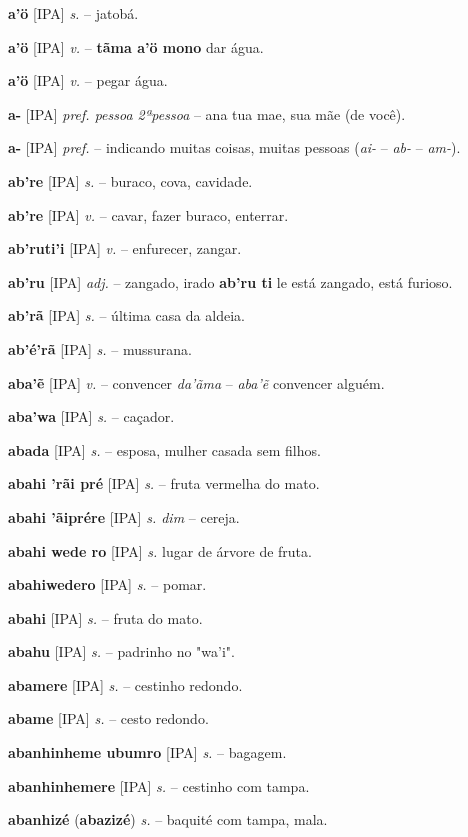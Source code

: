 \textbf{a'ö} [IPA] \textit{s.} -- jatobá.

\textbf{a'ö} [IPA] \textit{v.} -- \textbf{tãma a'ö mono} dar água.

\textbf{a'ö} [IPA] \textit{v.} -- pegar água.

\textbf{a-} [IPA] \textit{pref. pessoa 2ªpessoa} -- ana tua mae, sua mãe (de você).

\textbf{a-} [IPA] \textit{pref.} -- indicando muitas coisas, muitas pessoas (\textit{ai-} -- \textit{ab-} -- \textit{am-}).

\textbf{ab're} [IPA] \textit{s.} -- buraco, cova, cavidade.

\textbf{ab're} [IPA] \textit{v.} -- cavar, fazer buraco, enterrar.

\textbf{ab'ruti'i} [IPA] \textit{v.} -- enfurecer, zangar.

\textbf{ab'ru} [IPA] \textit{adj.} -- zangado, irado \textbf{ab'ru ti} le está zangado, está furioso.

\textbf{ab'rã} [IPA] \textit{s.} -- última casa da aldeia.

\textbf{ab'é'rã} [IPA] \textit{s.} -- mussurana.

\textbf{aba'ẽ} [IPA] \textit{v.} -- convencer  \textit{da'ãma} -- \textit{aba'ẽ} convencer alguém.

\textbf{aba'wa} [IPA] \textit{s.} -- caçador.

\textbf{abada} [IPA] \textit{s.} -- esposa, mulher casada sem filhos.

\textbf{abahi 'rãi pré} [IPA] \textit{s.} -- fruta vermelha do mato.

\textbf{abahi 'ãiprére} [IPA] \textit{s. dim} -- cereja.

\textbf{abahi wede ro} [IPA] \textit{s.} lugar de árvore de fruta.

\textbf{abahiwedero} [IPA] \textit{s.} -- pomar.

\textbf{abahi} [IPA] \textit{s.} -- fruta do mato.

\textbf{abahu} [IPA] \textit{s.} -- padrinho no "wa'i".

\textbf{abamere} [IPA] \textit{s.} -- cestinho redondo.

\textbf{abame} [IPA] \textit{s.} -- cesto redondo.

\textbf{abanhinheme ubumro} [IPA] \textit{s.} -- bagagem.

\textbf{abanhinhemere} [IPA] \textit{s.} -- cestinho com tampa.

\textbf{abanhizé} (\textbf{abazizé}) \textit{s.} --  baquité com tampa, mala.

